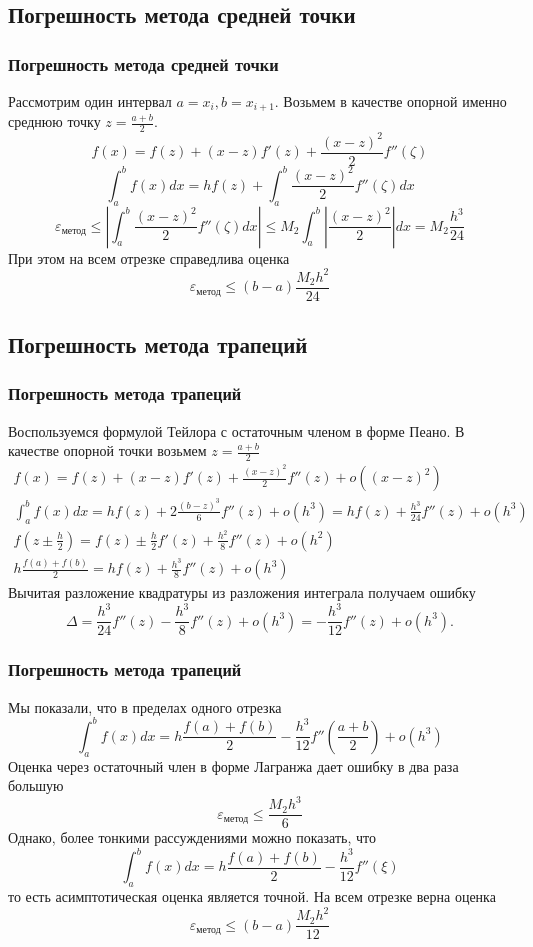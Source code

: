 \documentclass[apectratio=43,unicode]{beamer}
\begin{document}
\subsection{Погрешность метода средней точки}
\begin{frame}
\frametitle{Погрешность метода средней точки}
	Рассмотрим один интервал $a=x_i, b=x_{i+1}$.
	Возьмем в качестве опорной именно среднюю точку $z = \frac{a+b}{2}$.
	\[
	f(x) = f(z) + (x-z)f'(z) + \frac{(x-z)^2}{2}f''(\zeta)
	\]
	\[
	\int_a^b f(x) dx = h f(z) + \int_a^b \frac{(x-z)^2}{2}f''(\zeta) dx
	\]
	\[
	\varepsilon_{\text{метод}} \leq \left|\int_a^b \frac{(x-z)^2}{2}f''(\zeta) dx \right|
	\leq M_2 \int_a^b \left|\frac{(x-z)^2}{2}\right| dx  = M_2 \frac{h^3}{24}
	\]
	При этом на всем отрезке справедлива оценка
	\[
	\varepsilon_{\text{метод}} \leq (b-a) \frac{M_2h^2}{24}
	\]
\end{frame}

\subsection{Погрешность метода трапеций}
\begin{frame}
\frametitle{Погрешность метода трапеций}
	Воспользуемся формулой Тейлора с остаточным членом в форме Пеано. В качестве опорной точки возьмем $z = \frac{a+b}{2}$
	\begin{gather*}
	f(x) = f(z) + (x-z)f'(z) + \frac{(x-z)^2}{2}f''(z) + o((x-z)^2)\\
	\int_a^b f(x) dx = h f(z) + 2\frac{(b-z)^3}{6}f''(z) + o(h^3) = hf(z) +
\frac{h^3}{24}f''(z) + o(h^3)\\
	f\left(z \pm \frac{h}{2}\right) = f(z) \pm \frac{h}{2} f'(z) + \frac{h^2}{8}
f''(z) + o(h^2)\\
	h\frac{f(a)+f(b)}{2} = hf(z) + \frac{h^3}{8} f''(z) + o(h^3)
	\end{gather*}
	Вычитая разложение квадратуры из разложения интеграла получаем ошибку
	\[
	\Delta = \frac{h^3}{24}f''(z) - \frac{h^3}{8}f''(z) + o(h^3) = -\frac{h^3}{12}f''(z) + o(h^3).
	\]
\end{frame}

\begin{frame}
\frametitle{Погрешность метода трапеций}
	Мы показали, что в пределах одного отрезка
	\[
	\int_a^b f(x) dx = h\frac{f(a)+f(b)}{2} - \frac{h^3}{12}f''\left(\frac{a+b}{2}\right) + o(h^3)
	\]
	Оценка через остаточный член в форме Лагранжа дает ошибку в два раза большую
	\[
	\varepsilon_{\text{метод}} \leq \frac{M_2 h^3}{6}
	\]
	Однако, более тонкими рассуждениями можно показать, что
	\[
	\int_a^b f(x) dx = h\frac{f(a)+f(b)}{2} - \frac{h^3}{12}f''(\xi)
	\]
	то есть асимптотическая оценка является точной.  На всем отрезке верна оценка
	\[
	\varepsilon_{\text{метод}} \leq (b-a) \frac{M_2 h^2}{12}
	\]
\end{frame}
\end{document}
